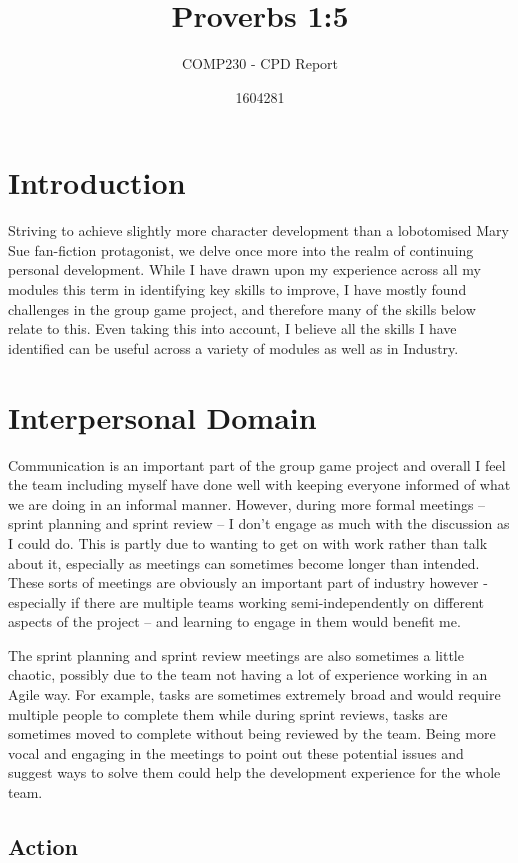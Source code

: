 \documentclass{scrartcl}
\title{Proverbs 1:5}
\subtitle{COMP230 - CPD Report}
\author{1604281}
\begin{document}
\maketitle

\section{Introduction}

Striving to achieve slightly more character development than a lobotomised Mary Sue fan-fiction protagonist, we delve once more into the realm of continuing personal development. While I have drawn upon my experience across all my modules this term in identifying key skills to improve, I have mostly found challenges in the group game project, and therefore many of the skills below relate to this. Even taking this into account, I believe all the skills I have identified can be useful across a variety of modules as well as in Industry.


\section{Interpersonal Domain}

Communication is an important part of the group game project and overall I feel the team including myself have done well with keeping everyone informed of what we are doing in an informal manner. However, during more formal meetings – sprint planning and sprint review – I don’t engage as much with the discussion as I could do. This is partly due to wanting to get on with work rather than talk about it, especially as meetings can sometimes become longer than intended. These sorts of meetings are obviously an important part of industry however - especially if there are multiple teams working semi-independently on different aspects of the project – and learning to engage in them would benefit me.

The sprint planning and sprint review meetings are also sometimes a little chaotic, possibly due to the team not having a lot of experience working in an Agile way. For example, tasks are sometimes extremely broad and would require multiple people to complete them while during sprint reviews, tasks are sometimes moved to complete without being reviewed by the team. Being more vocal and engaging in the meetings to point out these potential issues and suggest ways to solve them could help the development experience for the whole team.

\subsection{Action}
\end{document}

